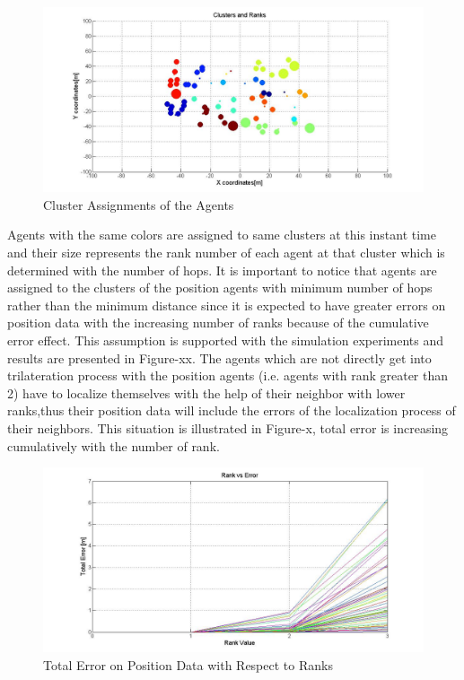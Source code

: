 \documentclass[twoside]{article}
\begin{document}
		\begin{figure}[H]
			\caption{Cluster Assignments of the Agents}
		\centerline{\includegraphics[scale = 0.4]{Clusters_Ranks_1}}
			\end{figure} 
	Agents with the same colors are assigned to same clusters at this instant time and their size represents the rank number of each agent at that cluster which is determined with the number of hops. It is important to notice that agents are assigned to the clusters of the position agents with minimum number of hops rather than the minimum distance since it is expected to have greater errors on position data with the increasing number of ranks because of the cumulative error effect. This assumption is supported with the simulation experiments and results are presented in Figure-xx. 
The agents which are not directly get into trilateration process with the position agents (i.e. agents with rank greater than 2) have to localize themselves with the help of their neighbor with lower ranks,thus their position data will include the errors of the localization process of their neighbors. This situation is illustrated in Figure-x, total error is increasing cumulatively with the number of rank. 
	

			\begin{figure}[H]
				\caption{Total Error on Position Data with Respect to Ranks}
				\centerline{\includegraphics[scale = 0.4]{Rank_vs_Error}}
		\end{figure} 
	
\end{document}
